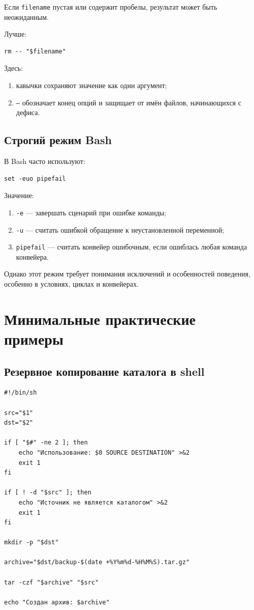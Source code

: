 \documentclass[12pt,a4paper]{article}
\begin{document}
Если \texttt{filename} пустая или содержит пробелы, результат может быть неожиданным.

Лучше:

\begin{lstlisting}
rm -- "$filename"
\end{lstlisting}

Здесь:
\begin{enumerate}
    \item кавычки сохраняют значение как один аргумент;
    \item \texttt{--} обозначает конец опций и защищает от имён файлов, начинающихся с дефиса.
\end{enumerate}

\subsection{Строгий режим Bash}

В Bash часто используют:

\begin{lstlisting}
set -euo pipefail
\end{lstlisting}

Значение:
\begin{enumerate}
    \item \texttt{-e} --- завершать сценарий при ошибке команды;
    \item \texttt{-u} --- считать ошибкой обращение к неустановленной переменной;
    \item \texttt{pipefail} --- считать конвейер ошибочным, если ошиблась любая команда конвейера.
\end{enumerate}

Однако этот режим требует понимания исключений и особенностей поведения, особенно в условиях, циклах и конвейерах.

\section{Минимальные практические примеры}

\subsection{Резервное копирование каталога в shell}

\begin{lstlisting}
#!/bin/sh

src="$1"
dst="$2"

if [ "$#" -ne 2 ]; then
    echo "Использование: $0 SOURCE DESTINATION" >&2
    exit 1
fi

if [ ! -d "$src" ]; then
    echo "Источник не является каталогом" >&2
    exit 1
fi

mkdir -p "$dst"

archive="$dst/backup-$(date +%Y%m%d-%H%M%S).tar.gz"

tar -czf "$archive" "$src"

echo "Создан архив: $archive"
\end{lstlisting}
\end{document}
